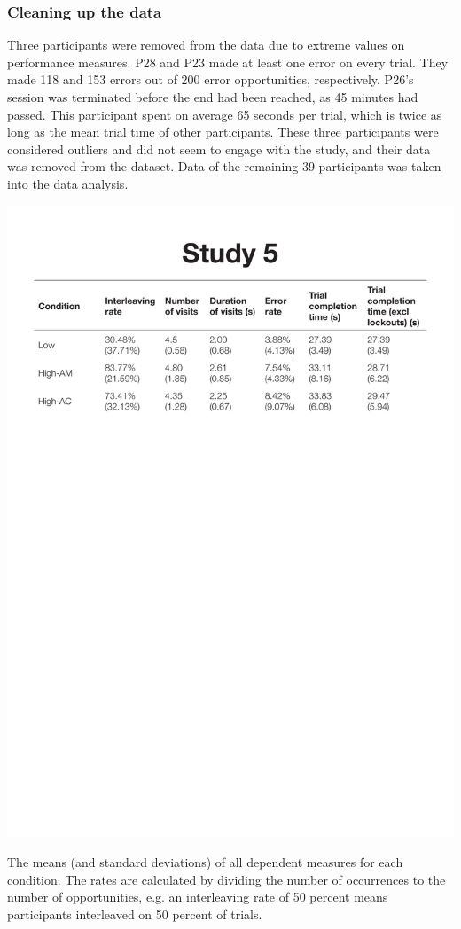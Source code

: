 \subsubsection{Cleaning up the data}
Three participants were removed from the data due to extreme values on performance measures.
P28 and P23 made at least one error on every trial. They made 118 and 153 errors out of 200 error opportunities, respectively. P26's session was terminated before the end had been reached, as 45 minutes had passed. This participant spent on average 65 seconds per trial, which is twice as long as the mean trial time of other participants. These three participants were considered outliers and did not seem to engage with the study, and their data was removed from the dataset. Data of the remaining 39 participants was taken into the data analysis.

\begin{table}
 \includegraphics[width=\textwidth]{images/ch34/ch34_5-means.pdf}
\caption[Study 5 means and SDs of dependent measures]{The means (and standard deviations) of all dependent measures for each condition. The rates are calculated by dividing the number of occurrences to the number of opportunities, e.g. an interleaving rate of 50 percent means participants interleaved on 50 percent of trials.}
\label{tbl:ch34_5-means}
\end{table}

